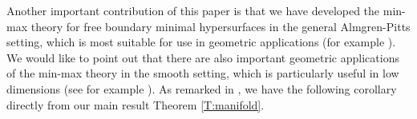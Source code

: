 \documentclass[10pt]{amsart}
\newtheorem{theorem}{Theorem}[section]
\theoremstyle{definition}
\theoremstyle{remark}
\numberwithin{equation}{section}
\begin{document}


Another important contribution of this paper is that we have developed the min-max theory for free boundary minimal hypersurfaces in the general Almgren-Pitts setting, which is most suitable for use in geometric applications (for example \cite{Marques-Neves14}). We would like to point out that there are also important geometric applications of the min-max theory in the smooth setting, which is particularly useful in low dimensions (see for example \cite{Smith82} \cite{Colding-deLellis03} \cite{Li15} \cite{DeLellis-Tasnady13} \cite{DeLellis-Ramic} \cite{Colding-Gabai-Ketover}). As remarked in \cite{Marques-Neves17}, we have the following corollary directly from our main result Theorem \ref{T:manifold}.
\end{document}
